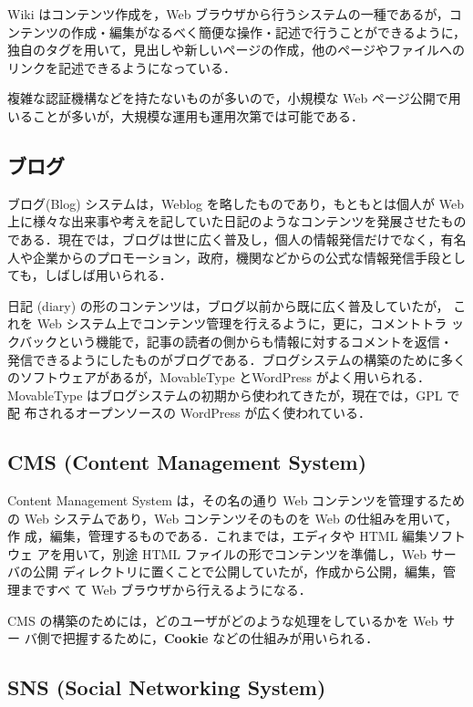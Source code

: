Wiki はコンテンツ作成を，Web ブラウザから行うシステムの一種であるが，コ
ンテンツの作成・編集がなるべく簡便な操作・記述で行うことができるように，
独自のタグを用いて，見出しや新しいページの作成，他のページやファイルへの
リンクを記述できるようになっている．

複雑な認証機構などを持たないものが多いので，小規模な Web ページ公開で用
いることが多いが，大規模な運用も運用次第では可能である．

\subsection{ブログ}
ブログ(Blog) システムは，Weblog を略したものであり，もともとは個人が Web 
上に様々な出来事や考えを記していた日記のようなコンテンツを発展させたもの
である．現在では，ブログは世に広く普及し，個人の情報発信だけでなく，有名
人や企業からのプロモーション，政府，機関などからの公式な情報発信手段とし
ても，しばしば用いられる．

日記 (diary) の形のコンテンツは，ブログ以前から既に広く普及していたが，
これを Web システム上でコンテンツ管理を行えるように，更に，コメントトラ
ックバックという機能で，記事の読者の側からも情報に対するコメントを返信・
発信できるようにしたものがブログである．ブログシステムの構築のために多く
のソフトウェアがあるが，MovableType とWordPress がよく用いられる．
MovableType はブログシステムの初期から使われてきたが，現在では，GPL で配
布されるオープンソースの WordPress が広く使われている．

\subsection{CMS (Content Management System)}
Content Management System は，その名の通り Web コンテンツを管理するため
の Web システムであり，Web コンテンツそのものを Web の仕組みを用いて，作
成，編集，管理するものである．これまでは，エディタや HTML 編集ソフトウェ
アを用いて，別途 HTML ファイルの形でコンテンツを準備し，Web サーバの公開
ディレクトリに置くことで公開していたが，作成から公開，編集，管理まですべ
て Web ブラウザから行えるようになる．

CMS の構築のためには，どのユーザがどのような処理をしているかを Web サー
バ側で把握するために，\textbf{Cookie} などの仕組みが用いられる．

\subsection{SNS (Social Networking System)}

